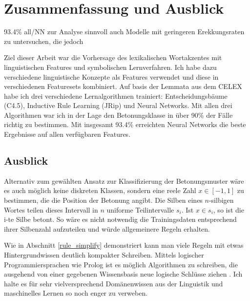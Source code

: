 \chapter{Zusammenfassung und Ausblick}

93.4\% all/NN
zur Analyse sinnvoll auch Modelle mit geringeren Erekkungsraten zu untersuchen, die jedoch 




















Ziel dieser Arbeit war die Vorhersage des lexikalischen Wortakzentes mit linguistischen Features und symbolischen Lernverfahren. Ich habe dazu verschiedene linguistische Konzepte als Features verwendet und diese in verschiedenen Featuresets kombiniert. Auf basis der Lemmata aus dem CELEX habe ich drei verschiedene Lernalgorithmen trainiert: Entscheidungsbäume (C4.5), Inductive Rule Learning (JRip) und Neural Networks. Mit allen drei Algorithmen war ich in der Lage den Betonungsklasse in über 90\% der Fälle richtig zu bestimmen. Mit insgesamt 93.4\% erreichten Neural Networks die beste Ergebnisse auf allen verfügbaren Features.

 






\section{Ausblick}
Alternativ zum gewählten Ansatz zur Klassifizierung der Betonungsmuster wäre es auch möglich keine diskreten Klassen, sondern eine reele Zahl $x \in [-1,1]$ zu bestimmen, die die Position der Betonung angibt. Die Silben eines $n$-silbigen Wortes teilen dieses Intervall in $n$ uniforme Teilintervalle $s_i$. Ist $x \in s_i$, so ist die i-te Silbe betont. So wäre es nicht notwendig die Trainingsdaten entsprechend ihrer Silbenzahl aufzuteilen und würde allgemeinere Regeln erhalten.

Wie in Abschnitt \ref{rule_simplify} demonstriert kann man viele Regeln mit etwas Hintergrundwissen deutlich kompakter Schreiben. Mittels logischer Programmiersprachen wie Prolog ist es möglich Algorithmen zu schreiben, die ausgehend von einer gegebenen Wissensbasis neue logische Schlüsse ziehen \cite[S.~706]{RusselNorvig}. Ich halte es für sehr vielversprechend Domänenwissen aus der Linguistik und maschinelles Lernen so noch enger zu verweben.


